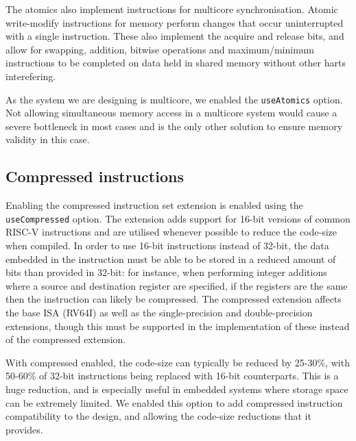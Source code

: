 The atomics also implement instructions for multicore synchronisation. Atomic write-modify instructions for memory perform changes that occur uninterrupted with a single instruction. These also implement the acquire and release bits, and allow for swapping, addition, bitwise operations and maximum/minimum instructions to be completed on data held in shared memory without other harts interefering.

As the system we are designing is multicore, we enabled the \texttt{useAtomics} option. Not allowing simultaneous memory access in a multicore system would cause a severe bottleneck in most cases and is the only other solution to ensure memory validity in this case.

\subsection{Compressed instructions}
Enabling the compressed instruction set extension is enabled using the \texttt{useCompressed} option. The extension adds support for 16-bit versions of common RISC-V instructions and are utilised whenever possible to reduce the code-size when compiled. In order to use 16-bit instructions instead of 32-bit, the data embedded in the instruction must be able to be stored in a reduced amount of bits than provided in 32-bit: for instance, when performing integer additions where a source and destination register are specified, if the registers are the same then the instruction can likely be compressed. The compressed extension affects the base ISA (RV64I) as well as the single-precision and double-precision extensions, though this must be supported in the implementation of these instead of the compressed extension.

With compressed enabled, the code-size can typically be reduced by 25-30\%, with 50-60\% of 32-bit instructions being replaced with 16-bit counterparts. This is a huge reduction, and is especially useful in embedded systems where storage space can be extremely limited. We enabled this option to add compressed instruction compatibility to the design, and allowing the code-size reductions that it provides.

